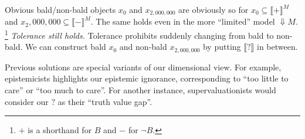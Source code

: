 \documentclass{tufte-handout}
\begin{document}
Obvious bald/non-bald objects $x_0$ and $x_{2,000,000}$ are obviously so
for $x_0 \subseteq \llbracket + \rrbracket^{M}$ and $x_2,000,000 \subseteq \llbracket - \rrbracket^{M}$.
The same holds even in the more ``limited'' model $\Downarrow M$.
\footnote{$+$ is a shorthand for $B$ and $-$ for $\neg B$. }
\emph{Tolerance still holds.} Tolerance prohibits suddenly changing from bald to non-bald.
We can construct bald $x_0$ and non-bald $x_{2,000,000}$
by putting $\llbracket ? \rrbracket$ in between.

Previous solutions are special variants of our dimensional view.
For example, epistemicists \cite{Williamson1994} highlights our epistemic ignorance, corresponding to ``too little to care'' or ``too much to care''.
For another instance, supervaluationists
\cite{Keefe2000}
 would consider our $?$ as their ``truth value gap''.


\pagebreak



\end{document}
